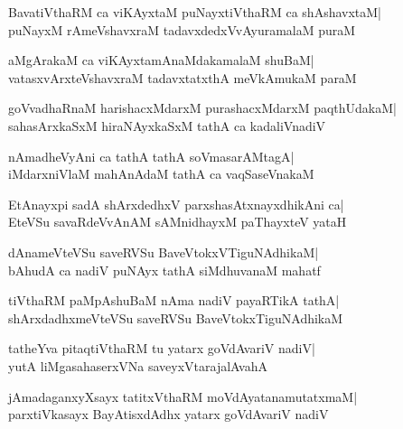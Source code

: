 \documentclass[twoside,12pt,openright]{book}
\newcounter{shloka}[chapter]
\begin{document}
\begin{shloka}%
BavatiVthaRM ca viKAyxtaM puNayxtiVthaRM ca shAshavxtaM|\\
puNayxM rAmeVshavxraM tadavxdedxVvAyuramalaM puraM
\end{shloka}

\begin{shloka}%
aMgArakaM ca viKAyxtamAnaMdakamalaM shuBaM|\\
vatasxvArxteVshavxraM tadavxtatxthA meVkAmukaM paraM 
\end{shloka}

\begin{shloka}%
goVvadhaRnaM harishacxMdarxM purashacxMdarxM paqthUdakaM|\\
sahasArxkaSxM hiraNAyxkaSxM tathA ca kadaliVnadiV
\end{shloka}

\begin{shloka}%
nAmadheVyAni ca tathA tathA soVmasarAMtagA|\\
iMdarxniVlaM mahAnAdaM tathA ca vaqSaseVnakaM
\end{shloka}

\begin{shloka}%
EtAnayxpi sadA shArxdedhxV parxshasAtxnayxdhikAni ca|\\
EteVSu savaRdeVvAnAM sAMnidhayxM paThayxteV yataH
\end{shloka}

\begin{shloka}%
dAnameVteVSu saveRVSu BaveVtokxVTiguNAdhikaM|\\
bAhudA ca nadiV puNAyx tathA siMdhuvanaM mahatf
\end{shloka}

\begin{shloka}%
tiVthaRM paMpAshuBaM nAma nadiV payaRTikA tathA|\\
shArxdadhxmeVteVSu saveRVSu BaveVtokxTiguNAdhikaM
\end{shloka}

\begin{shloka}%
tatheYva pitaqtiVthaRM tu yatarx goVdAvariV nadiV|\\
yutA liMgasahaserxVNa saveyxVtarajalAvahA
\end{shloka}

\begin{shloka}%
jAmadaganxyXsayx tatitxVthaRM moVdAyatanamutatxmaM|\\
parxtiVkasayx BayAtisxdAdhx yatarx goVdAvariV nadiV
\end{shloka}
\end{document}
